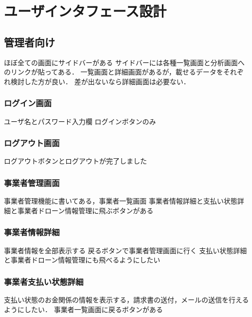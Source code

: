 \documentclass[a4paper, titlepage]{jsarticle}
\begin{document}
\section{ユーザインタフェース設計}
\subsection{管理者向け}
ほぼ全ての画面にサイドバーがある
サイドバーには各種一覧画面と分析画面へのリンクが貼ってある．
一覧画面と詳細画面があるが，載せるデータをそれぞれ検討した方が良い．
差が出ないなら詳細画面は必要ない．
\subsubsection{ログイン画面}
ユーザ名とパスワード入力欄
ログインボタンのみ
\subsubsection{ログアウト画面}
ログアウトボタンとログアウトが完了しました

\subsubsection{事業者管理画面}
事業者管理機能に書いてある，事業者一覧画面
事業者情報詳細と支払い状態詳細と事業者ドローン情報管理に飛ぶボタンがある
\subsubsection{事業者情報詳細}
事業者情報を全部表示する
戻るボタンで事業者管理画面に行く
支払い状態詳細と事業者ドローン情報管理にも飛べるようにしたい
\subsubsection{事業者支払い状態詳細}
支払い状態のお金関係の情報を表示する，請求書の送付，メールの送信を行えるようにしたい．
事業者一覧画面に戻るボタンがある
\end{document}
